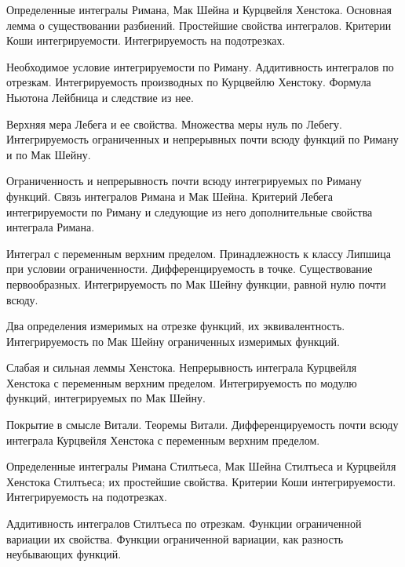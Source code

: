 \documentclass[a4paper]{article}
\begin{document}
\begin{nums}{-2}
\item Определенные интегралы Римана, Мак Шейна и Курцвейля Хенстока. Основная лемма
о существовании разбиений. Простейшие свойства интегралов. Критерии Коши интегрируемости.
Интегрируемость на подотрезках.

\item Необходимое условие интегрируемости по Риману. Аддитивность интегралов по отрезкам.
Интегрируемость производных по Курцвейлю Хенстоку. Формула Ньютона
Лейбница и следствие из нее.

\item Верхняя мера Лебега и ее свойства. Множества меры нуль по Лебегу. Интегрируемость
ограниченных и непрерывных почти всюду функций по Риману и по Мак Шейну.

\item Ограниченность и непрерывность почти всюду интегрируемых по Риману функций.
Связь интегралов Римана и Мак Шейна. Критерий Лебега интегрируемости по Риману
и следующие из него дополнительные свойства интеграла Римана.

\item Интеграл с переменным верхним пределом. Принадлежность к классу Липшица при
условии ограниченности. Дифференцируемость в точке. Существование первообразных.
Интегрируемость по Мак Шейну функции, равной нулю почти всюду.

\item Два определения измеримых на отрезке функций, их эквивалентность. Интегрируемость
по Мак Шейну ограниченных измеримых функций.

\item Слабая и сильная леммы Хенстока. Непрерывность интеграла Курцвейля Хенстока с
переменным верхним пределом. Интегрируемость по модулю функций, интегрируемых
по Мак Шейну.

\item Покрытие в смысле Витали. Теоремы Витали. Дифференцируемость почти всюду интеграла
Курцвейля Хенстока с переменным верхним пределом.

\item Определенные интегралы Римана Стилтьеса, Мак Шейна Стилтьеса и Курцвейля
Хенстока Стилтьеса; их простейшие свойства. Критерии Коши интегрируемости. Интегрируемость
на подотрезках.

\item Аддитивность интегралов Стилтьеса по отрезкам. Функции ограниченной вариации их
свойства. Функции ограниченной вариации, как разность неубывающих функций.


\end{nums}
\end{document}
